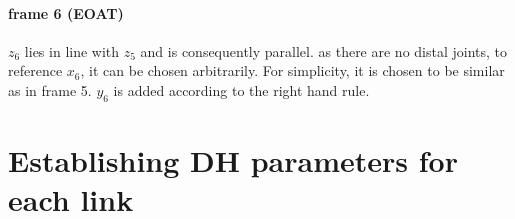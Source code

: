 \paragraph{frame 6 (EOAT)}
$z_6$ lies in line with $z_5$ and is consequently parallel.
as there are no distal joints, to reference $x_6$, it can be chosen arbitrarily. 
For simplicity, it is chosen to be similar as in frame 5. 
$y_6$ is added according to the right hand rule.

\section{Establishing \ac{DH} parameters for each link}




